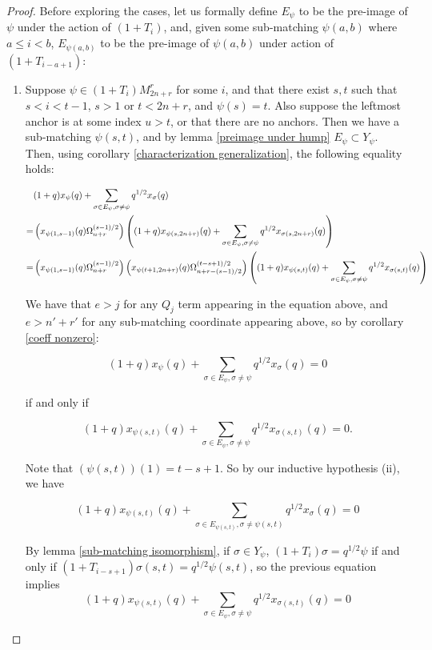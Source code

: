 \documentclass{amsart}
\begin{document}
\begin{proof}
 	Before exploring the cases, let us formally define $E_\psi$ to be the pre-image of $\psi$ under the action of $(1+T_i)$, and, given some sub-matching $\psi(a,b)$ where $a\leq i<b$, $E_{\psi(a,b)}$ to be the pre-image of $\psi(a,b)$ under action of $(1+T_{i-a+1})$:
 	
 	\begin{enumerate}[label={\textit{Case \arabic*.}}]
 		\item Suppose $\psi\in (1+T_i)M_{2n+r}^r$ for some $i$, and that there exist $s,t$ such that $s<i<t-1$, $s>1$ or $t<2n+r$, and $\psi(s)=t$. Also suppose the leftmost anchor is at some index $u>t$, or that there are no anchors. Then we have a sub-matching $\psi(s,t)$, and by lemma \ref{preimage under hump} $E_\psi\subset Y_\psi$. Then, using corollary \ref{characterization generalization}, the following equality holds:
 		
 		\begin{align*}
 			&(1+q)x_\psi(q)+\sum_{\sigma\in E_\psi,\sigma\not=\psi}q^{1/2}x_\sigma(q)\\
 			=&\left( x_{\psi(1,s-1)}(q)\Omega_{n+r}^{(s-1)/2} \right)\left( (1+q)x_{\psi(s,2n+r)}(q)+\sum_{\sigma\in E_\psi,\sigma\not=\psi}q^{1/2}x_{\sigma(s,2n+r)}(q) \right)\\
 			=&\left( x_{\psi(1,s-1)}(q)\Omega_{n+r}^{(s-1)/2} \right)\left( x_{\psi(t+1,2n+r)}(q)\Omega_{n+r-(s-1)/2}^{(t-s+1)/2} \right)\left( (1+q)x_{\psi(s,t)}(q)+\sum_{\sigma\in E_\psi,\sigma\not=\psi}q^{1/2}x_{\sigma(s,t)}(q) \right)
 		\end{align*}
 		
 		We have that $e>j$ for any $Q_j$ term appearing in the equation above, and $e>n'+r'$ for any sub-matching coordinate appearing above, so by corollary \ref{coeff nonzero}:
 		
 		$$(1+q)x_\psi(q)+\sum_{\sigma\in E_\psi,\sigma\not=\psi}q^{1/2}x_\sigma(q)=0$$
 		
 		if and only if
 		
 		$$(1+q)x_{\psi(s,t)}(q)+\sum_{\sigma\in E_\psi,\sigma\not=\psi}q^{1/2}x_{\sigma(s,t)}(q)=0\text{.}$$
 		
 		Note that $(\psi(s,t))(1)=t-s+1$. So by our inductive hypothesis (ii), we have 
 		
 		$$(1+q)x_{\psi(s,t)}(q)+\sum_{\sigma\in E_{\psi(s,t)},\sigma\not=\psi(s,t)}q^{1/2}x_{\sigma}(q)=0$$
 		
 		By lemma \ref{sub-matching isomorphism}, if $\sigma\in Y_\psi$, $(1+T_i)\sigma=q^{1/2}\psi$ if and only if $(1+T_{i-s+1})\sigma(s,t)=q^{1/2}\psi(s,t)$, so the previous equation implies $$(1+q)x_{\psi(s,t)}(q)+\sum_{\sigma\in E_\psi,\sigma\not=\psi}q^{1/2}x_{\sigma(s,t)}(q)=0$$
 		

\end{enumerate}
\end{proof}
\end{document}
